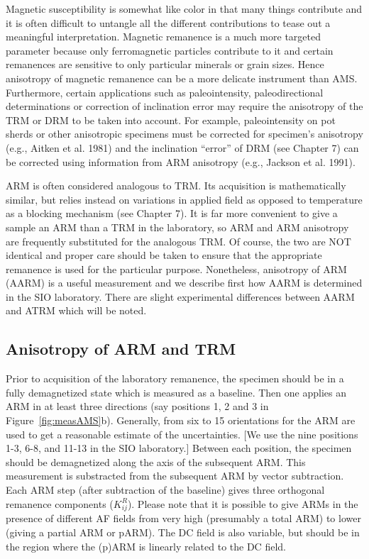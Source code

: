  Magnetic susceptibility is somewhat like color in that many things contribute and it is often difficult to  untangle all the different contributions to tease out a meaningful interpretation.   Magnetic remanence is a much more targeted parameter because only ferromagnetic particles contribute to it and certain remanences are sensitive to only particular minerals or grain sizes.  Hence anisotropy of magnetic remanence can be a more delicate instrument than AMS.  Furthermore, certain applications such as paleointensity,  paleodirectional determinations or correction of inclination error may require the anisotropy of the TRM or DRM to be taken into account.  For example, paleointensity on pot sherds or other anisotropic specimens must be corrected for  specimen's anisotropy (e.g., 
 Aitken et al. 1981) \nocite{aitken81}  and the inclination ``error'' of DRM (see Chapter 7) can be corrected using information from ARM anisotropy (e.g., 
 Jackson et al. 1991).  \nocite{jackson91}
 
  ARM is often considered analogous to TRM.  Its acquisition is mathematically similar, but relies instead on variations in applied field as opposed to temperature as a blocking mechanism (see Chapter 7).   It is far more convenient to give a sample an ARM than a TRM in the laboratory, so ARM and ARM anisotropy are frequently substituted for the analogous TRM.  Of course, the two are NOT identical and proper care should be taken to ensure that the appropriate remanence is used for the particular purpose.  Nonetheless, anisotropy of ARM (AARM) is a useful measurement and we describe first how AARM is determined in the SIO laboratory.  There are slight experimental differences between AARM and ATRM which will be noted.  


 \subsection{Anisotropy of ARM and TRM}
 \label{sect:aarm}
  
 Prior to acquisition of the laboratory remanence, the specimen should be in a fully demagnetized state which is measured as a baseline.  Then one applies an  ARM  in at least three directions (say positions 1, 2 and 3 in Figure~\ref{fig:measAMS}b).   Generally, from six to 15 orientations for the ARM are used to get a reasonable estimate of the uncertainties.  [We use the nine positions 1-3, 6-8, and 11-13 in the SIO laboratory.]  Between each position, the specimen should be demagnetized along the axis of the subsequent ARM.  This measurement is  substracted from the subsequent ARM by vector subtraction.    Each  ARM step (after subtraction of the baseline)   gives  three orthogonal  remanence components    ($K^R_{ij}$).   Please note that it is possible to give ARMs in the presence of different AF fields from very high (presumably a total ARM) to lower (giving a partial ARM or pARM).  The DC field is also variable, but should be in the region where the (p)ARM is linearly related to the DC field. 
 
